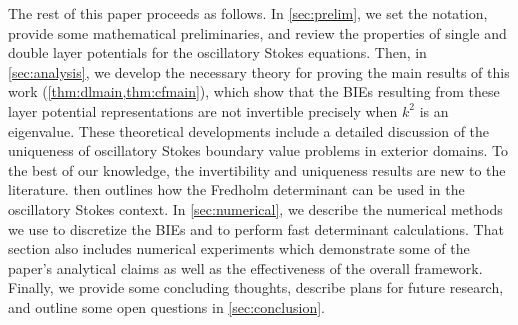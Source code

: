 The rest of this paper proceeds as follows.
%
In \cref{sec:prelim}, we set the notation, provide some
mathematical preliminaries, and review the
properties of single and double layer potentials
for the oscillatory Stokes equations.
%
Then, in \cref{sec:analysis}, we develop the necessary
theory for proving the main results of this work 
(\cref{thm:dlmain,thm:cfmain}),
which show that the BIEs resulting from these
layer potential representations are not invertible
precisely when $k^2$ is an eigenvalue.
%
These theoretical developments include a detailed
discussion of the uniqueness of oscillatory Stokes
boundary value problems in exterior domains.
%
To the best of our knowledge, the invertibility
and uniqueness results are new to the literature.
%
 then outlines how the Fredholm determinant
can be used in the oscillatory Stokes context.
%
In \cref{sec:numerical}, we describe the numerical
methods we use to discretize the BIEs and to perform
fast determinant calculations.
%
That section also includes numerical experiments
which demonstrate some of the paper's analytical
claims as well as the effectiveness of the overall
framework.
%
Finally, we provide some concluding thoughts,
describe plans for future research,
and outline some open questions in
\cref{sec:conclusion}.
